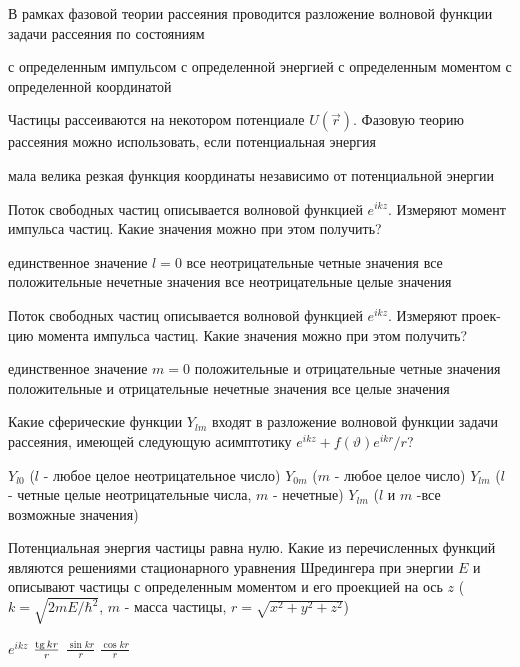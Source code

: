 \documentclass[11pt,a4paper]{exam}
\begin{document}
\begin{questions}
\question В рамках фазовой теории рассеяния проводится разложение волновой функции задачи рассеяния по состояниям
\begin{choices}
\choice с определенным импульсом
\choice с определенной энергией
\choice с определенным моментом
\choice с определенной координатой
\end{choices}

\question Частицы рассеиваются на некотором потенциале $U(\vec r)$. Фазовую теорию рассеяния можно использовать, если потенциальная энергия 
\begin{choices}
\choice мала
\choice велика
\choice резкая функция координаты
\choice независимо от потенциальной энергии
\end{choices}

\question Поток свободных частиц описывается волновой функцией ${e^{ikz}}$. Измеряют момент импульса частиц. Какие значения можно при этом получить?
\begin{choices}
\choice единственное значение $l = 0$
\choice все неотрицательные четные значения
\choice все положительные нечетные значения
\choice все неотрицательные целые значения 
\end{choices}

\question Поток свободных частиц описывается волновой функцией ${e^{ikz}}$. Измеряют проек-цию момента импульса частиц. Какие значения можно при этом получить?
\begin{choices}
\choice единственное значение $m = 0$
\choice положительные и отрицательные четные значения
\choice положительные и отрицательные нечетные значения
\choice все целые значения 
\end{choices}

\question Какие сферические функции ${Y_{lm}}$ входят в разложение волновой функции задачи рассеяния, имеющей следующую асимптотику ${e^{ikz}} + f(\vartheta ){e^{ikr}}/r$?
\begin{choices}
\choice ${Y_{l0}}$ ($l$ - любое целое неотрицательное число)
\choice ${Y_{0m}}$ ($m$ - любое целое число)
\choice ${Y_{lm}}$ ($l$ - четные целые неотрицательные числа, $m$ - нечетные)
\choice ${Y_{lm}}$ ($l$ и $m$ -все возможные значения)
\end{choices}

\question Потенциальная энергия частицы равна нулю. Какие из перечисленных функций являются решениями стационарного уравнения Шредингера при энергии $E$ и описывают частицы с определенным моментом и его проекцией на ось $z$ ($k = \sqrt {2mE/{\hbar ^2}} $, $m$ - масса частицы, $r = \sqrt {{x^2} + {y^2} + {z^2}} $)
\begin{choices}
\choice ${e^{ikz}}$    
\choice $\frac{{{\rm{tg}}\,kr}}{r}$   
\choice $\frac{{\sin kr}}{r}$   
\choice $\frac{{\cos kr}}{r}$
\end{choices}


\end{questions}
\end{document}
